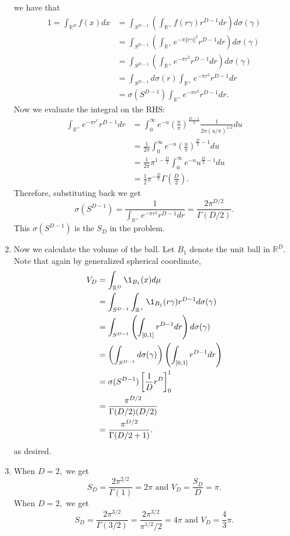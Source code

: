 \begin{enumerate}[leftmargin={*}]
we have that 
\begin{align*}
1=\int_{\mathbb{R}^{D}}f(x)dx & =\int_{S^{D-1}}\left(\int_{\mathbb{R^{+}}}f(r\gamma)r^{D-1}dr\right)d\sigma(\gamma)\\
 & =\int_{S^{D-1}}\left(\int_{\mathbb{R}^{+}}e^{-\pi\left\Vert r\gamma\right\Vert ^{2}}r^{D-1}dr\right)d\sigma(\gamma)\\
 & =\int_{S^{D-1}}\left(\int_{\mathbb{R}^{+}}e^{-\pi r^{2}}r^{D-1}dr\right)d\sigma(\gamma)\\
 & =\int_{S^{D-1}}d\sigma(r)\int_{\mathbb{R}^{+}}e^{-\pi r^{2}}r^{D-1}dr\\
 & =\sigma(S^{D-1})\int_{\mathbb{R}^{+}}e^{-\pi r^{2}}r^{D-1}dr.
\end{align*}
Now we evaluate the integral on the RHS: 
\begin{align*}
\int_{\mathbb{R}^{+}}e^{-\pi r^{r}}r^{D-1}dr & =\int_{0}^{\infty}e^{-u}\left(\frac{u}{\pi}\right)^{\frac{D-1}{2}}\frac{1}{2\pi(u/\pi)^{1/2}}du\\
 & =\frac{1}{2\pi}\int_{0}^{\infty}e^{-u}\left(\frac{u}{\pi}\right)^{\frac{D}{2}-1}du\\
 & =\frac{1}{2\pi}\pi^{1-\frac{D}{2}}\int_{0}^{\infty}e^{-u}u{}^{\frac{D}{2}-1}du\\
 & =\frac{1}{2}\pi^{-\frac{D}{2}}\Gamma\left(\frac{D}{2}\right).
\end{align*}
Therefore, substituting back we get 
\[
\sigma(S^{D-1})=\frac{1}{\int_{\mathbb{R}^{+}}e^{-\pi r^{2}}r^{D-1}dr}=\frac{2\pi^{D/2}}{\Gamma\left(D/2\right)}.
\]
This $\sigma(S^{D-1})$ is the $S_{D}$ in the problem. 
\item Now we calculate the volume of the ball. Let $B_{1}$ denote the unit
ball in $\mathbb{R}^{D}$. Note that again by generalized spherical
coordinate, 
\begin{align*}
V_{D} & =\int_{\mathbb{R}^{D}}\1_{B_{1}}(x)d\mu\\
 & =\int_{S^{D-1}}\int_{\mathbb{R}^{+}}\1_{B_{1}}(r\gamma)r^{D-1}d\sigma(\gamma)\\
 & =\int_{S^{D-1}}\left(\int_{[0,1]}r^{D-1}dr\right)d\sigma(\gamma)\\
 & =\left(\int_{S^{D-1}}d\sigma(\gamma)\right)\left(\int_{[0,1]}r^{D-1}dr\right)\\
 & =\sigma(S^{D-1})\left[\frac{1}{D}r^{D}\right]_{0}^{1}\\
 & =\frac{\pi^{D/2}}{\Gamma(D/2)(D/2)}\\
 & =\frac{\pi^{D/2}}{\Gamma(D/2+1)}.
\end{align*}
as desired. 
\item When $D=2,$ we get 
\[
S_{D}=\frac{2\pi^{2/2}}{\Gamma(1)}=2\pi\text{ and }V_{D}=\frac{S_{D}}{D}=\pi.
\]
When $D=2,$ we get 
\[
S_{D}=\frac{2\pi^{3/2}}{\Gamma(3/2)}=\frac{2\pi^{3/2}}{\pi^{1/2}/2}=4\pi\text{ and }V_{D}=\frac{4}{3}\pi.
\]
\end{enumerate}
